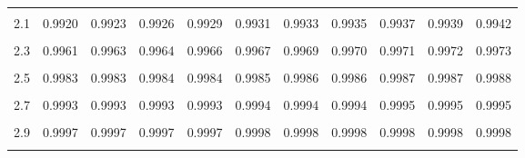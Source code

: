 \documentclass[
]{article}
\begin{document}
\begin{longtable}[l]{lcccccccccc}
\cellcolor{gray!15}{2} & \cellcolor{gray!15}{0.9889} & \cellcolor{gray!15}{0.9893} & \cellcolor{gray!15}{0.9896} & \cellcolor{gray!15}{0.9899} & \cellcolor{gray!15}{0.9903} & \cellcolor{gray!15}{0.9906} & \cellcolor{gray!15}{0.9909} & \cellcolor{gray!15}{0.9912} & \cellcolor{gray!15}{0.9916} & \cellcolor{gray!15}{0.9918}\\
2.1 & 0.9920 & 0.9923 & 0.9926 & 0.9929 & 0.9931 & 0.9933 & 0.9935 & 0.9937 & 0.9939 & 0.9942\\
\cellcolor{gray!15}{2.2} & \cellcolor{gray!15}{0.9943} & \cellcolor{gray!15}{0.9945} & \cellcolor{gray!15}{0.9947} & \cellcolor{gray!15}{0.9949} & \cellcolor{gray!15}{0.9951} & \cellcolor{gray!15}{0.9953} & \cellcolor{gray!15}{0.9954} & \cellcolor{gray!15}{0.9956} & \cellcolor{gray!15}{0.9958} & \cellcolor{gray!15}{0.9960}\\
2.3 & 0.9961 & 0.9963 & 0.9964 & 0.9966 & 0.9967 & 0.9969 & 0.9970 & 0.9971 & 0.9972 & 0.9973\\
\cellcolor{gray!15}{2.4} & \cellcolor{gray!15}{0.9973} & \cellcolor{gray!15}{0.9974} & \cellcolor{gray!15}{0.9976} & \cellcolor{gray!15}{0.9977} & \cellcolor{gray!15}{0.9978} & \cellcolor{gray!15}{0.9979} & \cellcolor{gray!15}{0.9979} & \cellcolor{gray!15}{0.9980} & \cellcolor{gray!15}{0.9981} & \cellcolor{gray!15}{0.9982}\\
2.5 & 0.9983 & 0.9983 & 0.9984 & 0.9984 & 0.9985 & 0.9986 & 0.9986 & 0.9987 & 0.9987 & 0.9988\\
\cellcolor{gray!15}{2.6} & \cellcolor{gray!15}{0.9988} & \cellcolor{gray!15}{0.9989} & \cellcolor{gray!15}{0.9990} & \cellcolor{gray!15}{0.9990} & \cellcolor{gray!15}{0.9991} & \cellcolor{gray!15}{0.9991} & \cellcolor{gray!15}{0.9991} & \cellcolor{gray!15}{0.9992} & \cellcolor{gray!15}{0.9992} & \cellcolor{gray!15}{0.9992}\\
2.7 & 0.9993 & 0.9993 & 0.9993 & 0.9993 & 0.9994 & 0.9994 & 0.9994 & 0.9995 & 0.9995 & 0.9995\\
\cellcolor{gray!15}{2.8} & \cellcolor{gray!15}{0.9995} & \cellcolor{gray!15}{0.9995} & \cellcolor{gray!15}{0.9996} & \cellcolor{gray!15}{0.9996} & \cellcolor{gray!15}{0.9996} & \cellcolor{gray!15}{0.9996} & \cellcolor{gray!15}{0.9996} & \cellcolor{gray!15}{0.9997} & \cellcolor{gray!15}{0.9997} & \cellcolor{gray!15}{0.9997}\\
2.9 & 0.9997 & 0.9997 & 0.9997 & 0.9997 & 0.9998 & 0.9998 & 0.9998 & 0.9998 & 0.9998 & 0.9998\\
\cellcolor{gray!15}{3} & \cellcolor{gray!15}{0.9998} & \cellcolor{gray!15}{0.9998} & \cellcolor{gray!15}{0.9998} & \cellcolor{gray!15}{0.9998} & \cellcolor{gray!15}{0.9998} & \cellcolor{gray!15}{0.9998} & \cellcolor{gray!15}{0.9998} & \cellcolor{gray!15}{0.9998} & \cellcolor{gray!15}{0.9998} & \cellcolor{gray!15}{0.9999}\\

\end{longtable}
\end{document}
